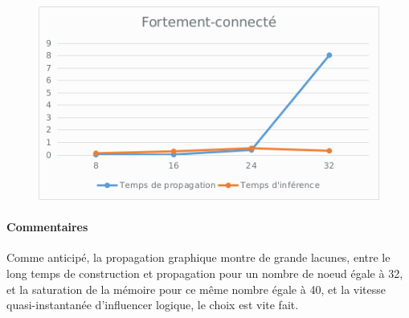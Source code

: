 \documentclass[]{report}
\begin{document}
	\begin{table}[H]
	\centering
	\end{table}

	\begin{figure}[H]
		\centering
		\includegraphics[width=0.75\linewidth]{sheets/strongly.png}
	\end{figure}

	\paragraph{Commentaires}
	Comme anticipé, la propagation graphique montre de grande lacunes, entre le long temps de construction et propagation pour un 
	nombre de noeud égale à 32, et la saturation de la mémoire pour ce même nombre égale à 40, et la vitesse quasi-instantanée 
	d'influencer logique, le choix est vite fait.
\end{document}
